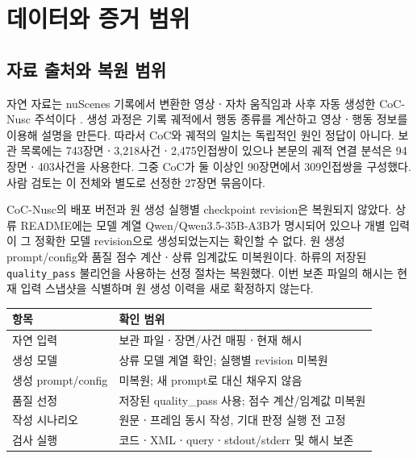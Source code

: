 \section{데이터와 증거 범위}
\label{sec:data}

\begin{revision}

\subsection{자료 출처와 복원 범위}
\label{sec:provenance}
자연 자료는 nuScenes 기록에서 변환한 영상ㆍ자차 움직임과 사후 자동 생성한 CoC-Nusc 주석이다 \cite{caesar2020nuscenes,nvidia2026autolabeler}. 생성 과정은 기록 궤적에서 행동 종류를 계산하고 영상ㆍ행동 정보를 이용해 설명을 만든다. 따라서 CoC와 궤적의 일치는 독립적인 원인 정답이 아니다. 보관 목록에는 743장면ㆍ3,218사건ㆍ2,475인접쌍이 있으나 본문의 궤적 연결 분석은 94장면ㆍ403사건을 사용한다. 그중 CoC가 둘 이상인 90장면에서 309인접쌍을 구성했다. 사람 검토는 이 전체와 별도로 선정한 27장면 묶음이다.

CoC-Nusc의 배포 버전과 원 생성 실행별 checkpoint revision은 복원되지 않았다. 상류 README에는 모델 계열 Qwen/Qwen3.5-35B-A3B가 명시되어 있으나 개별 입력이 그 정확한 모델 revision으로 생성되었는지는 확인할 수 없다. 원 생성 prompt/config와 품질 점수 계산ㆍ상류 임계값도 미복원이다. 하류의 저장된 \texttt{quality\_pass} 불리언을 사용하는 선정 절차는 복원했다. 이번 보존 파일의 해시는 현재 입력 스냅샷을 식별하며 원 생성 이력을 새로 확정하지 않는다.

\begin{table}[t]
\centering
\color{revisionblue}
\label{tab:provenance}
\footnotesize
\begin{tabularx}{\columnwidth}{L{.34\columnwidth}Y}
\toprule
항목 & 확인 범위 \\
\midrule
자연 입력 & 보관 파일ㆍ장면/사건 매핑ㆍ현재 해시 \\
생성 모델 & 상류 모델 계열 확인; 실행별 revision 미복원 \\
생성 prompt/config & 미복원; 새 prompt로 대신 채우지 않음 \\
품질 선정 & 저장된 quality\_pass 사용; 점수 계산/임계값 미복원 \\
작성 시나리오 & 원문ㆍ프레임 동시 작성, 기대 판정 실행 전 고정 \\
검사 실행 & 코드ㆍXMLㆍqueryㆍstdout/stderr 및 해시 보존 \\
\bottomrule
\end{tabularx}
\end{table}


\end{revision}
